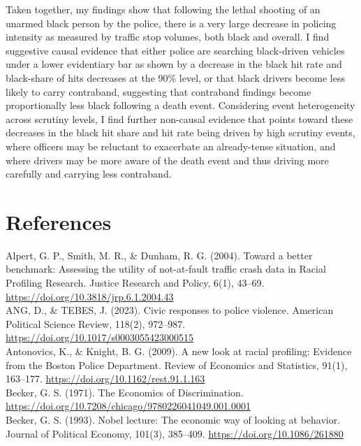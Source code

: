 \documentclass[12pt,a4paper]{article}
\begin{document}
Taken together, my findings show that following the lethal shooting of an unarmed black person by the police, there is a very large decrease in policing intensity as measured by traffic stop volumes, both black and overall. I find suggestive causal evidence that either police are searching black-driven vehicles under a lower evidentiary bar as shown by a decrease in the black hit rate and black-share of hits decreases at the 90\% level, or that black drivers become less likely to carry contraband, suggesting that contraband findings become proportionally less black following a death event. Considering event heterogeneity across scrutiny levels, I find further non-causal evidence that points toward these decreases in the black hit share and hit rate being driven by high scrutiny events, where officers may be reluctant to exacerbate an already-tense situation, and where drivers may be more aware of the death event and thus driving more carefully and carrying less contraband. \\

\section{References}
Alpert, G. P., Smith, M. R., \& Dunham, R. G. (2004). Toward a better benchmark: Assessing the utility of not-at-fault traffic crash data in Racial Profiling Research. Justice Research and Policy, 6(1), 43–69. \url{https://doi.org/10.3818/jrp.6.1.2004.43} \\

ANG, D., \& TEBES, J. (2023). Civic responses to police violence. American Political Science Review, 118(2), 972–987. \url{https://doi.org/10.1017/s0003055423000515} \\

Antonovics, K., \& Knight, B. G. (2009). A new look at racial profiling: Evidence from the Boston Police Department. Review of Economics and Statistics, 91(1), 163–177. \url{https://doi.org/10.1162/rest.91.1.163} \\

Becker, G. S. (1971). The Economics of Discrimination. \url{https://doi.org/10.7208/chicago/9780226041049.001.0001} \\

Becker, G. S. (1993). Nobel lecture: The economic way of looking at behavior. Journal of Political Economy, 101(3), 385–409. \url{https://doi.org/10.1086/261880} \\
\end{document}
